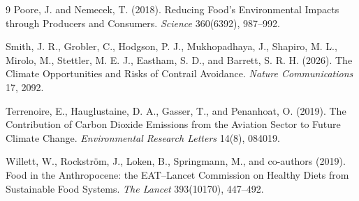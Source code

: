 \documentclass[12pt,a4paper]{article}
\begin{document}
\begin{thebibliography}{9}
Poore, J. and Nemecek, T. (2018).
\newblock Reducing Food's Environmental Impacts through Producers and Consumers.
\newblock \emph{Science} 360(6392), 987--992.

Smith, J. R., Grobler, C., Hodgson, P. J., Mukhopadhaya, J., Shapiro, M. L., Mirolo, M., Stettler, M. E. J., Eastham, S. D., and Barrett, S. R. H. (2026).
\newblock The Climate Opportunities and Risks of Contrail Avoidance.
\newblock \emph{Nature Communications} 17, 2092.

Terrenoire, E., Hauglustaine, D. A., Gasser, T., and Penanhoat, O. (2019).
\newblock The Contribution of Carbon Dioxide Emissions from the Aviation Sector to Future Climate Change.
\newblock \emph{Environmental Research Letters} 14(8), 084019.

Willett, W., Rockstr\"om, J., Loken, B., Springmann, M., and co-authors (2019).
\newblock Food in the Anthropocene: the EAT--Lancet Commission on Healthy Diets from Sustainable Food Systems.
\newblock \emph{The Lancet} 393(10170), 447--492.

\end{thebibliography}
\end{document}
